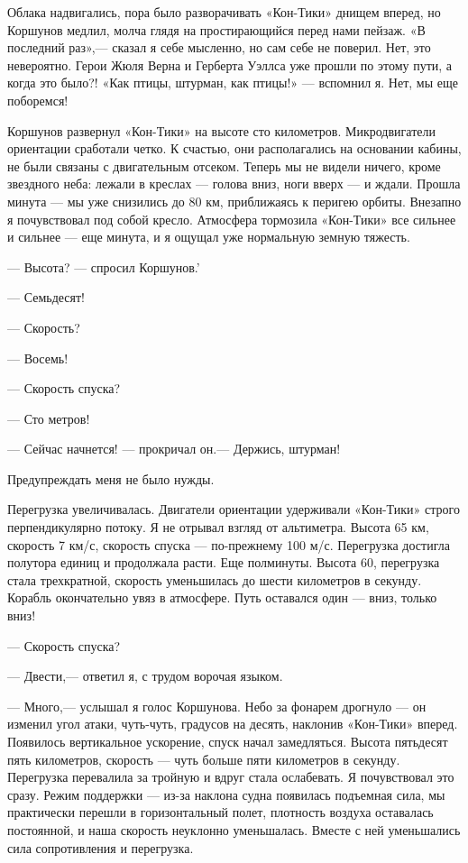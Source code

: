 \documentclass[11pt,a4paper,oneside]{article}
\begin{document}
Облака надвигались, пора было разворачивать «Кон-Тики» днищем вперед, но Коршунов медлил, молча глядя на простирающийся перед нами пейзаж. «В последний раз»,— сказал я себе мысленно, но сам себе не поверил. Нет, это невероятно. Герои Жюля Верна и Герберта Уэллса уже прошли по этому пути, а когда это было?! «Как птицы, штурман, как птицы!» — вспомнил я. Нет, мы еще поборемся!

Коршунов развернул «Кон-Тики» на высоте сто километров. Микродвигатели ориентации сработали четко. К счастью, они располагались на основании кабины, не были связаны с двигательным отсеком. Теперь мы не видели ничего, кроме звездного неба: лежали в креслах — голова вниз, ноги вверх — и ждали. Прошла минута — мы уже снизились до 80 км, приближаясь к перигею орбиты. Внезапно я почувствовал под собой кресло. Атмосфера тормозила «Кон-Тики» все сильнее и сильнее — еще минута, и я ощущал уже нормальную земную тяжесть.

— Высота? — спросил Коршунов.'

— Семьдесят!

— Скорость?

— Восемь!

— Скорость спуска?

— Сто метров!

— Сейчас начнется! — прокричал он.— Держись, штурман!

Предупреждать меня не было нужды.

Перегрузка увеличивалась. Двигатели ориентации удерживали «Кон-Тики» строго перпендикулярно потоку. Я не отрывал взгляд от альтиметра. Высота 65 км, скорость 7 км/с, скорость спуска — по-прежнему 100 м/с. Перегрузка достигла полутора единиц и продолжала расти. Еще полминуты. Высота 60, перегрузка стала трехкратной, скорость уменьшилась до шести километров в секунду. Корабль окончательно увяз в атмосфере. Путь оставался один — вниз, только вниз!

— Скорость спуска?

— Двести,— ответил я, с трудом ворочая языком.

— Много,— услышал я голос Коршунова. Небо за фонарем дрогнуло — он изменил угол атаки, чуть-чуть, градусов на десять, наклонив «Кон-Тики» вперед. Появилось вертикальное ускорение, спуск начал замедляться. Высота пятьдесят пять километров, скорость — чуть больше пяти километров в секунду. Перегрузка перевалила за тройную и вдруг стала ослабевать. Я почувствовал это сразу. Режим поддержки — из-за наклона судна появилась подъемная сила, мы практически перешли в горизонтальный полет, плотность воздуха оставалась постоянной, и наша скорость неуклонно уменьшалась. Вместе с ней уменьшались сила сопротивления и перегрузка.
\end{document}
